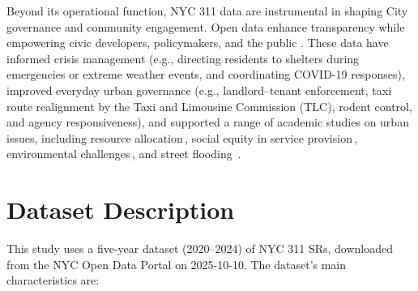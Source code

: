 \documentclass[linenumber]{jdsart}
\begin{document}
Beyond its operational function, NYC 311 data are instrumental in shaping
City governance and community engagement. Open data enhance transparency while
empowering civic developers, policymakers, and the public
\citep{minkoff2016nyc,o2017uncharted,kontokosta2021bias}. These data have
informed crisis management (e.g., directing residents to shelters during
emergencies or extreme weather events, and coordinating COVID-19 responses),
improved everyday urban governance (e.g., landlord–tenant enforcement, taxi
route realignment by the Taxi and Limousine Commission (TLC), rodent control,
and agency responsiveness), and supported a range of academic studies on urban
issues, including resource allocation\,\citep{zha2014profiling,raj2021swift},
social equity in service provision\,\citep{white2018promises,kontokosta2021bias},
environmental challenges\,\citep{dove2022sounds}, and street flooding
\,\citep{agonafir2022understanding}.


\section{Dataset Description}
\label{sec:data}
This study uses a five-year dataset (2020--2024) of NYC 311 SRs, downloaded
from the NYC Open Data Portal on 2025-10-10. The dataset’s main characteristics
are:
\end{document}
